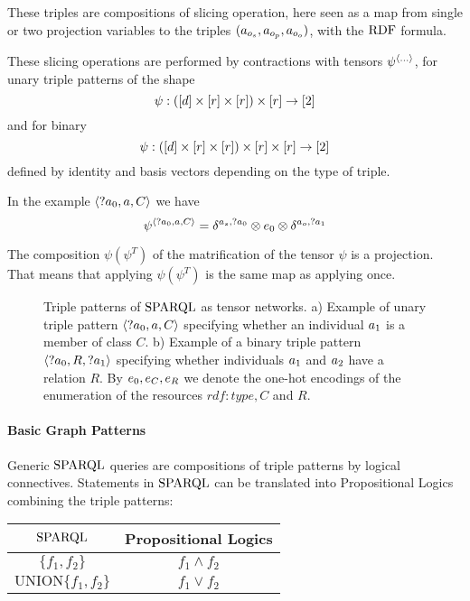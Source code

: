 These triples are compositions of slicing operation, here seen as a map from single or two projection variables to the triples $(a_{o_{s}}, a_{o_{p}}, a_{o_{o}})$, with the $\mathrm{RDF}$ formula.


These slicing operations are performed by contractions with tensors $\psi^{\braket{...}}$, for unary triple patterns of the shape
	\[ \psi : \left( [d] \times [r] \times [r] \right) \times [r] \rightarrow [2] \]
and for binary
	\[ \psi : \left( [d] \times [r] \times [r] \right) \times [r] \times [r] \rightarrow [2] \]
defined by identity and basis vectors depending on the type of triple.

In the example $\braket{?a_{0},a,C}$ we have
	\[ \psi^{\braket{?a_{0},a,C}} = \delta^{a_{s},?a_{0}} \otimes e_{0} \otimes \delta^{a_{o},?a_{1}}   \]


%
The composition $\psi (\psi^T)$ of the matrification of the tensor $\psi$ is a projection.
That means that applying $\psi (\psi^T)$ is the same map as applying once.


\begin{figure}[h]
\begin{center}
		
\end{center}
\caption{Triple patterns of $\mathrm{SPARQL}$ as tensor networks.
	a) Example of unary triple pattern $\braket{?a_{0},a,C}$ specifying whether an individual $a_{1}$ is a member of class $C$. 
	b) Example of a binary triple pattern $\braket{?a_{0},R,?a_{1}}$ specifying whether individuals $a_{1}$ and $a_{2}$ have a relation $R$.
		By $e_{0},e_{C},e_{R}$ we denote the one-hot encodings of the enumeration of the resources $rdf:type, C$ and $R$.}
\label{fig:triplePatterns}
\end{figure}




\paragraph{Basic Graph Patterns}

Generic $\mathrm{SPARQL}$ queries are compositions of triple patterns by logical connectives. %
Statements in $\mathrm{SPARQL}$ can be translated into Propositional Logics combining the triple patterns:
\begin{center}
	\begin{tabular}{|c|c|}
  	\hline
 	\textbf{$\mathrm{SPARQL}$} & \textbf{Propositional Logics} \\
  	\hline
 	$\{f_1, f_2\}$ & $f_1\land f_2$ \\
  	\hline
 	$\mathrm{UNION}\{f_1, f_2\} $& $f_1\lor f_2$ \\
  	\hline
	\end{tabular}
\end{center}

